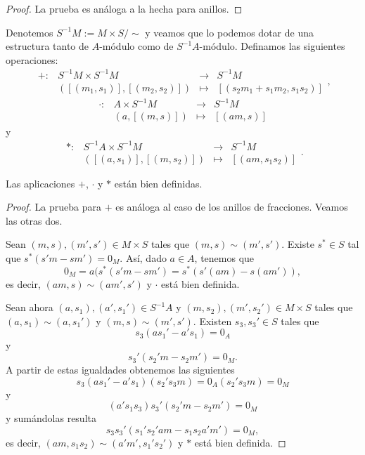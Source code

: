 \documentclass[../main.tex]{subfiles}
\begin{document}
\begin{remark}
\begin{proof}
	La prueba es análoga a la hecha para anillos.
\end{proof}

Denotemos $S^{-1}M:=M\times S/\sim$ y veamos que lo podemos dotar de una estructura tanto de $A$-módulo como de $S^{-1}A$-módulo. Definamos las siguientes operaciones:
$$\begin{array}{rrcl}
+:&S^{-1}M\times S^{-1}M&\longrightarrow&S^{-1}M  \\
&([(m_1,s_1)],[(m_2,s_2)])&\longmapsto&[(s_2m_1+s_1m_2,s_1s_2)]
\end{array},$$
$$\begin{array}{rrcl}
·:&A\times S^{-1}M&\longrightarrow&S^{-1}M  \\
&(a,[(m,s)])&\longmapsto&[(am,s)]
\end{array}$$
y
$$\begin{array}{rrcl}
*:&S^{-1}A\times S^{-1}M&\longrightarrow&S^{-1}M  \\
&([(a,s_1)],[(m,s_2)])&\longmapsto&[(am,s_1s_2)]
\end{array}.$$

\begin{proposition}
	Las aplicaciones $+$, $·$ y $*$ están bien definidas. 
\end{proposition}

\begin{proof}
	La prueba para $+$ es análoga al caso de los anillos de fracciones. Veamos las otras dos.
	
	Sean $(m,s),(m',s')\in M\times S$ tales que $(m,s)\sim(m',s')$. Existe $s^*\in S$ tal que $s^*(s'm-sm')=0_M$. Así, dado $a\in A$, tenemos que
	$$0_M=a(s^*(s'm-sm')=s^*(s'(am)-s(am')),$$
	es decir, $(am,s)\sim (am',s')$ y $·$ está bien definida.
	
	Sean ahora $(a,s_1),(a',s_1')\in S^{-1}A$ y $(m,s_2),(m',s_2')\in M\times S$ tales que $(a,s_1)\sim(a,s_1')$ y $(m,s)\sim(m',s')$. Existen $s_3,s_3'\in S$ tales que
	\begin{equation}\label{ext1}
	s_3(as_1'-a's_1)=0_A
	\end{equation} y \begin{equation}\label{ext2}
	s_3'(s_2'm-s_2m')=0_M.
	\end{equation}
	A partir de estas igualdades obtenemos las siguientes
	\begin{equation}\label{ext3}
	s_3(as_1'-a's_1)(s_2's_3m)=0_A(s_2's_3m)=0_M
	\end{equation} y \begin{equation}\label{ext4}
	(a's_1s_3)s_3'(s_2'm-s_2m')=0_M
	\end{equation}
	y sumándolas resulta
	$$s_3s_3'(s_1's_2'am-s_1s_2a'm')=0_M,$$
	es decir, $(am,s_1s_2)\sim(a'm',s_1's_2')$ y $*$ está bien definida.
\end{proof}


\end{remark}
\end{document}
